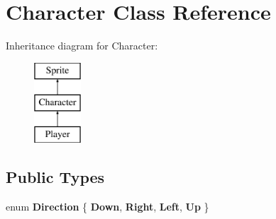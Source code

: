 \hypertarget{classCharacter}{\section{Character Class Reference}
\label{classCharacter}
}
Inheritance diagram for Character\+:\begin{figure}[H]
\begin{center}
\leavevmode
\includegraphics[height=3.000000cm]{classCharacter}
\end{center}
\end{figure}
\subsection*{Public Types}
\begin{DoxyCompactItemize}
\item 
\hypertarget{classCharacter_a0ee8f654ac7fbd527d0f64441cfc50ea}{enum {\bfseries Direction} \{ {\bfseries Down}, 
{\bfseries Right}, 
{\bfseries Left}, 
{\bfseries Up}
 \}}\label{classCharacter_a0ee8f654ac7fbd527d0f64441cfc50ea}

\end{DoxyCompactItemize}
